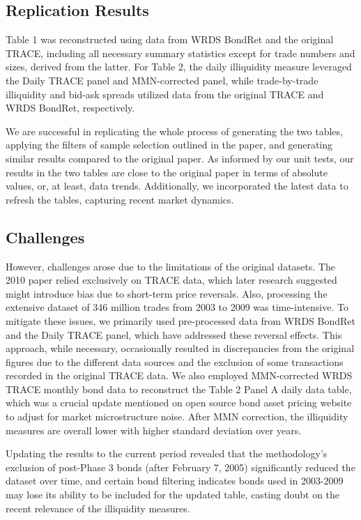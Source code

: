 \documentclass{article}
\begin{document}
\subsection{Replication Results}
Table 1 was reconstructed using data from WRDS BondRet and the original TRACE, including all necessary summary statistics except for trade numbers and sizes, derived from the latter. For Table 2, the daily illiquidity measure leveraged the Daily TRACE panel and MMN-corrected panel, while trade-by-trade illiquidity and bid-ask spreads utilized data from the original TRACE and WRDS BondRet, respectively.

We are successful in replicating the whole process of generating the two tables, applying the filters of sample selection outlined in the paper, and generating similar results compared to the original paper. As informed by our unit tests, our results in the two tables are close to the original paper in terms of absolute values, or, at least, data trends. Additionally, we incorporated the latest data to refresh the tables, capturing recent market dynamics.

\subsection{Challenges}
However, challenges arose due to the limitations of the original datasets. The 2010 paper relied exclusively on TRACE data, which later research suggested might introduce bias due to short-term price reversals. Also, processing the extensive dataset of 346 million trades from 2003 to 2009 was time-intensive. To mitigate these issues, we primarily used pre-processed data from WRDS BondRet and the Daily TRACE panel, which have addressed these reversal effects. This approach, while necessary, occasionally resulted in discrepancies from the original figures due to the different data sources and the exclusion of some transactions recorded in the original TRACE data. We also employed MMN-corrected WRDS TRACE monthly bond data to reconstruct the Table 2 Panel A daily data table, which was a crucial update mentioned on open source bond asset pricing website to adjust for market microstructure noise. After MMN correction, the illiquidity measures are overall lower with higher standard deviation over years.

Updating the results to the current period revealed that the methodology's exclusion of post-Phase 3 bonds (after February 7, 2005) significantly reduced the dataset over time, and certain bond filtering indicates bonds used in 2003-2009 may lose its ability to be included for the updated table, casting doubt on the recent relevance of the illiquidity measures. 
\end{document}
